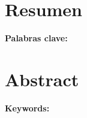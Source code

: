 \newpage
\thispagestyle{empty}
\chapter*{\sffamily Resumen}
%
\begin{center}
\textbf{\large \thesisname}
\end{center}
\par
\vspace{2cm}

\textbf{Palabras clave:} \palabrasclave

\newpage
\thispagestyle{empty}
\chapter*{\sffamily Abstract}
%
\begin{center}
\textbf{\large \thesisnameeng}
\end{center}
\par
\vspace{2cm}

\textbf{Keywords:} \keywords

